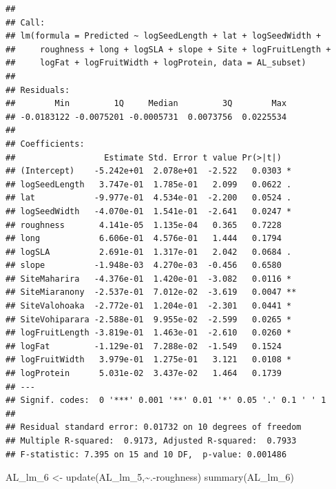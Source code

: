 \documentclass[
  12pt,
]{article}
\newenvironment{Shaded}{\begin{snugshade}}{\end{snugshade}}
\newcommand{\FunctionTok}[1]{\textcolor[rgb]{0.00,0.00,0.00}{#1}}
\newcommand{\NormalTok}[1]{#1}
\newcommand{\OtherTok}[1]{\textcolor[rgb]{0.56,0.35,0.01}{#1}}
\newcommand{\SpecialCharTok}[1]{\textcolor[rgb]{0.00,0.00,0.00}{#1}}
\begin{document}
\begin{verbatim}
## 
## Call:
## lm(formula = Predicted ~ logSeedLength + lat + logSeedWidth + 
##     roughness + long + logSLA + slope + Site + logFruitLength + 
##     logFat + logFruitWidth + logProtein, data = AL_subset)
## 
## Residuals:
##        Min         1Q     Median         3Q        Max 
## -0.0183122 -0.0075201 -0.0005731  0.0073756  0.0225534 
## 
## Coefficients:
##                  Estimate Std. Error t value Pr(>|t|)   
## (Intercept)    -5.242e+01  2.078e+01  -2.522   0.0303 * 
## logSeedLength   3.747e-01  1.785e-01   2.099   0.0622 . 
## lat            -9.977e-01  4.534e-01  -2.200   0.0524 . 
## logSeedWidth   -4.070e-01  1.541e-01  -2.641   0.0247 * 
## roughness       4.141e-05  1.135e-04   0.365   0.7228   
## long            6.606e-01  4.576e-01   1.444   0.1794   
## logSLA          2.691e-01  1.317e-01   2.042   0.0684 . 
## slope          -1.948e-03  4.270e-03  -0.456   0.6580   
## SiteMaharira   -4.376e-01  1.420e-01  -3.082   0.0116 * 
## SiteMiaranony  -2.537e-01  7.012e-02  -3.619   0.0047 **
## SiteValohoaka  -2.772e-01  1.204e-01  -2.301   0.0441 * 
## SiteVohiparara -2.588e-01  9.955e-02  -2.599   0.0265 * 
## logFruitLength -3.819e-01  1.463e-01  -2.610   0.0260 * 
## logFat         -1.129e-01  7.288e-02  -1.549   0.1524   
## logFruitWidth   3.979e-01  1.275e-01   3.121   0.0108 * 
## logProtein      5.031e-02  3.437e-02   1.464   0.1739   
## ---
## Signif. codes:  0 '***' 0.001 '**' 0.01 '*' 0.05 '.' 0.1 ' ' 1
## 
## Residual standard error: 0.01732 on 10 degrees of freedom
## Multiple R-squared:  0.9173, Adjusted R-squared:  0.7933 
## F-statistic: 7.395 on 15 and 10 DF,  p-value: 0.001486
\end{verbatim}

\begin{Shaded}
\begin{Highlighting}[]
\NormalTok{AL\_lm\_6 }\OtherTok{\textless{}{-}} \FunctionTok{update}\NormalTok{(AL\_lm\_5,}\SpecialCharTok{\textasciitilde{}}\NormalTok{.}\SpecialCharTok{{-}}\NormalTok{roughness)}
\FunctionTok{summary}\NormalTok{(AL\_lm\_6)}
\end{Highlighting}
\end{Shaded}
\end{document}
